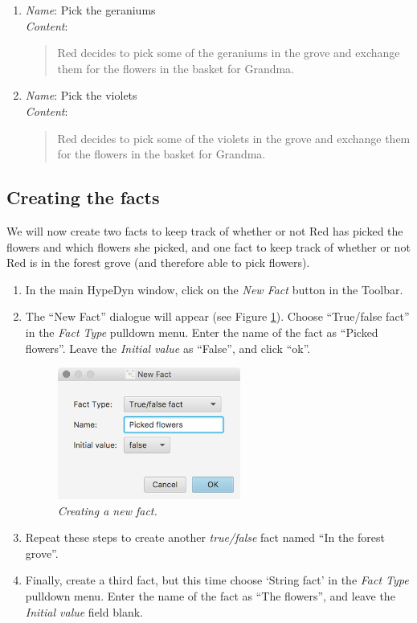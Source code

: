 \documentclass{article}
\begin{document}
\begin{enumerate}
  \item \textit{Name}: Pick the geraniums\\
  \textit{Content}: 
  \begin{quotation}
  \noindent Red decides to pick some of the geraniums in the grove and exchange them for the flowers in the basket for Grandma.
  \end{quotation}
  \item \textit{Name}: Pick the violets\\
  \textit{Content}: 
  \begin{quotation}
  \noindent Red decides to pick some of the violets in the grove and exchange them for the flowers in the basket for Grandma.
  \end{quotation}
\end{enumerate}

\subsection{Creating the facts}

We will now create two facts to keep track of whether or not Red has picked the flowers and which flowers she picked, and one fact to keep track of whether or not Red is in the forest grove (and therefore able to pick flowers).

\begin{enumerate}
  \item In the main HypeDyn window, click on the \textit{New Fact} button in the Toolbar. 
  \item The ``New Fact'' dialogue will appear (see Figure
  \ref{fig:tut3:newfact}). Choose ``True/false fact'' in the \textit{Fact Type} pulldown menu. Enter the name of the fact as ``Picked flowers''. Leave the \textit{Initial value} as ``False'', and click ``ok''.

\begin{figure}[h]
  \centering
  \includegraphics[width=6cm]{images/hypedyn-tutorial-3-figure-9}
  \caption{\textit{Creating a new fact.}}
  \label{fig:tut3:newfact}
\end{figure}

  \item Repeat these steps to create another \textit{true/false} fact named ``In the forest grove''.
  \item Finally, create a third fact, but this time choose `String fact' in the \textit{Fact Type} pulldown menu. Enter the name of the fact as ``The flowers'', and leave the \textit{Initial value} field blank.
\end{enumerate}
\end{document}
